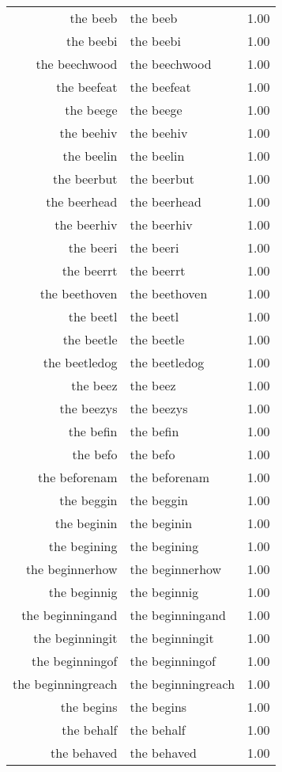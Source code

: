 \begin{table}[ht]
\begin{tabular}{rlr}
  the beeb & the beeb & 1.00 \\ 
  the beebi & the beebi & 1.00 \\ 
  the beechwood & the beechwood & 1.00 \\ 
  the beefeat & the beefeat & 1.00 \\ 
  the beege & the beege & 1.00 \\ 
  the beehiv & the beehiv & 1.00 \\ 
  the beelin & the beelin & 1.00 \\ 
  the beerbut & the beerbut & 1.00 \\ 
  the beerhead & the beerhead & 1.00 \\ 
  the beerhiv & the beerhiv & 1.00 \\ 
  the beeri & the beeri & 1.00 \\ 
  the beerrt & the beerrt & 1.00 \\ 
  the beethoven & the beethoven & 1.00 \\ 
  the beetl & the beetl & 1.00 \\ 
  the beetle & the beetle & 1.00 \\ 
  the beetledog & the beetledog & 1.00 \\ 
  the beez & the beez & 1.00 \\ 
  the beezys & the beezys & 1.00 \\ 
  the befin & the befin & 1.00 \\ 
  the befo & the befo & 1.00 \\ 
  the beforenam & the beforenam & 1.00 \\ 
  the beggin & the beggin & 1.00 \\ 
  the beginin & the beginin & 1.00 \\ 
  the begining & the begining & 1.00 \\ 
  the beginnerhow & the beginnerhow & 1.00 \\ 
  the beginnig & the beginnig & 1.00 \\ 
  the beginningand & the beginningand & 1.00 \\ 
  the beginningit & the beginningit & 1.00 \\ 
  the beginningof & the beginningof & 1.00 \\ 
  the beginningreach & the beginningreach & 1.00 \\ 
  the begins & the begins & 1.00 \\ 
  the behalf & the behalf & 1.00 \\ 
  the behaved & the behaved & 1.00 \\ 

\end{tabular}
\end{table}
